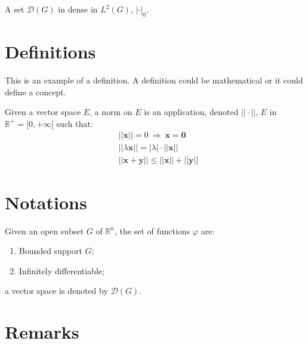 \documentclass[11pt,fleqn,a5paper]{book} %
\begin{document}
    \begin{theorem}
    A set $\mathcal{D}(G)$ in dense in $L^2(G)$, $|\cdot|_0$. 
    \end{theorem}
    
    
    \section{Definitions}
    
    This is an example of a definition. A definition could be mathematical or it could define a concept.
    
    \begin{definition}
    Given a vector space $E$, a norm on $E$ is an application, denoted $||\cdot||$, $E$ in $\mathbb{R}^+=[0,+\infty[$ such that:
    \begin{align}
    & ||\mathbf{x}||=0\ \Rightarrow\ \mathbf{x}=\mathbf{0}\\
    & ||\lambda \mathbf{x}||=|\lambda|\cdot ||\mathbf{x}||\\
    & ||\mathbf{x}+\mathbf{y}||\leq ||\mathbf{x}||+||\mathbf{y}||
    \end{align}
    \end{definition}
    
    
    \section{Notations}
    
    \begin{notation}
    Given an open subset $G$ of $\mathbb{R}^n$, the set of functions $\varphi$ are:
    \begin{enumerate}
    \item Bounded support $G$;
    \item Infinitely differentiable;
    \end{enumerate}
    a vector space is denoted by $\mathcal{D}(G)$. 
    \end{notation}
    
    
    \section{Remarks}
    
\end{document}
